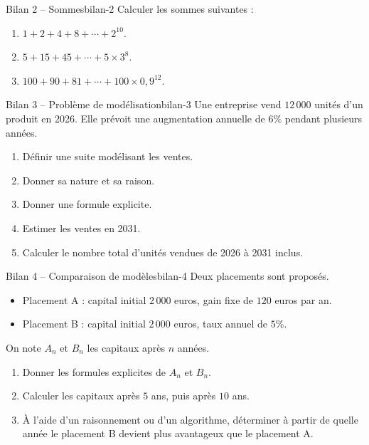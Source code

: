 \documentclass[11pt,a4paper]{article}
\begin{document}
\begin{exercisebox}{Bilan 2 -- Sommes}{bilan-2}
Calculer les sommes suivantes :
\begin{enumerate}
  \item $1+2+4+8+\cdots+2^{10}$.
  \item $5+15+45+\cdots+5\times3^8$.
  \item $100+90+81+\cdots+100\times0{,}9^{12}$.
\end{enumerate}
\end{exercisebox}

\begin{exercisebox}{Bilan 3 -- Problème de modélisation}{bilan-3}
Une entreprise vend $12\,000$ unités d'un produit en 2026. Elle prévoit une augmentation annuelle de $6\%$ pendant plusieurs années.
\begin{enumerate}
  \item Définir une suite modélisant les ventes.
  \item Donner sa nature et sa raison.
  \item Donner une formule explicite.
  \item Estimer les ventes en 2031.
  \item Calculer le nombre total d'unités vendues de 2026 à 2031 inclus.
\end{enumerate}
\end{exercisebox}

\begin{exercisebox}{Bilan 4 -- Comparaison de modèles}{bilan-4}
Deux placements sont proposés.
\begin{itemize}
  \item Placement A : capital initial $2\,000$ euros, gain fixe de $120$ euros par an.
  \item Placement B : capital initial $2\,000$ euros, taux annuel de $5\%$.
\end{itemize}
On note $A_n$ et $B_n$ les capitaux après $n$ années.
\begin{enumerate}
  \item Donner les formules explicites de $A_n$ et $B_n$.
  \item Calculer les capitaux après $5$ ans, puis après $10$ ans.
  \item À l'aide d'un raisonnement ou d'un algorithme, déterminer à partir de quelle année le placement B devient plus avantageux que le placement A.
\end{enumerate}
\end{exercisebox}
\end{document}
